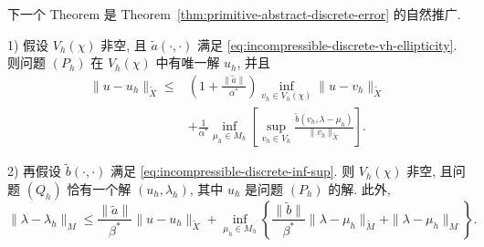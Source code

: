 下一个 Theorem 是
Theorem~\ref{thm:primitive-abstract-discrete-error} 的自然推广.

\begin{Theorem}\label{thm:incompressible-abstract-mixed-error}
\textup{1)} 假设 $V_h(\chi)$ 非空, 且
$\widetilde a(\cdot,\cdot)$ 满足
\eqref{eq:incompressible-discrete-vh-ellipticity}.
则问题 $(P_h)$ 在 $V_h(\chi)$ 中有唯一解 $u_h$, 并且
\begin{equation}\label{eq:incompressible-velocity-abstract-error}
\begin{aligned}
\|u-u_h\|_{\widetilde X}
\leq{}&
\left(1+\frac{\|\widetilde a\|}{\alpha^*}\right)
\inf_{v_h\in V_h(\chi)}
\|u-v_h\|_{\widetilde X}\\
&+\frac1{\alpha^*}
\inf_{\mu_h\in M_h}
\left[
\sup_{v_h\in V_h}
\frac{\widetilde b(v_h,\lambda-\mu_h)}
{\|v_h\|_{\widetilde X}}
\right].
\end{aligned}
\end{equation}

\textup{2)} 再假设 $\widetilde b(\cdot,\cdot)$ 满足
\eqref{eq:incompressible-discrete-inf-sup}.
则 $V_h(\chi)$ 非空, 且问题 $(Q_h)$ 恰有一个解
$(u_h,\lambda_h)$, 其中 $u_h$ 是问题 $(P_h)$ 的解.
此外,
\begin{equation}\label{eq:incompressible-multiplier-abstract-error}
\|\lambda-\lambda_h\|_M
\leq
\frac{\|\widetilde a\|}{\beta^*}
\|u-u_h\|_{\widetilde X}
+
\inf_{\mu_h\in M_h}
\left\{
\frac{\|\widetilde b\|}{\beta^*}
\|\lambda-\mu_h\|_{\widetilde M}
+\|\lambda-\mu_h\|_M
\right\}.
\end{equation}
\end{Theorem}

